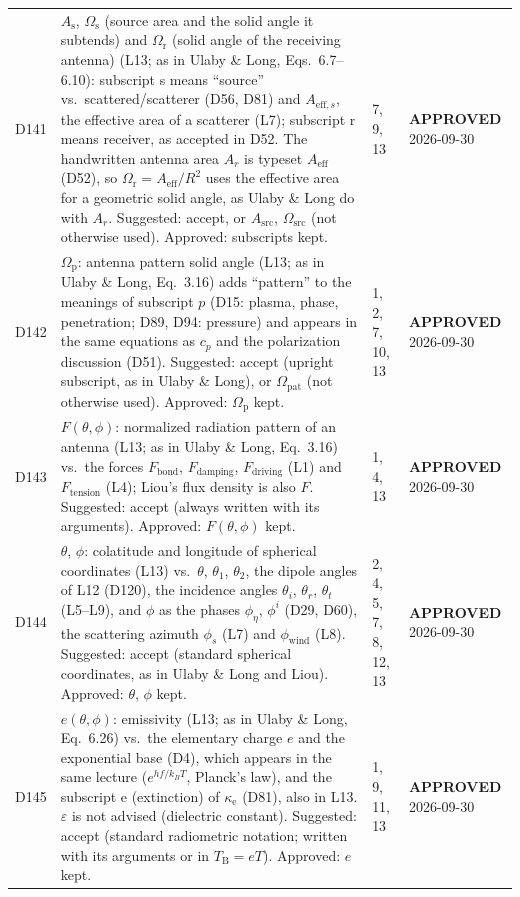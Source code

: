 \documentclass[11pt, oneside]{article}
\newcommand{\approved}{\textbf{APPROVED}}
\begin{document}
\begin{longtable}{l >{\raggedright\arraybackslash}p{} l l}
D141 & $A_\mathrm{s}$, $\Omega_\mathrm{s}$ (source area and the solid angle it subtends) and $\Omega_\mathrm{r}$ (solid angle of the receiving antenna) (L13; as in Ulaby \& Long, Eqs.~6.7--6.10): subscript s means ``source'' vs.\ scattered/scatterer (D56, D81) and $A_{\mathrm{eff},s}$, the effective area of a scatterer (L7); subscript r means receiver, as accepted in D52. The handwritten antenna area $A_r$ is typeset $A_\mathrm{eff}$ (D52), so $\Omega_\mathrm{r} = A_\mathrm{eff}/R^2$ uses the effective area for a geometric solid angle, as Ulaby \& Long do with $A_r$. Suggested: accept, or $A_\mathrm{src}$, $\Omega_\mathrm{src}$ (not otherwise used). Approved: subscripts kept. & 7, 9, 13 & \approved{} 2026-09-30 \\
D142 & $\Omega_\mathrm{p}$: antenna pattern solid angle (L13; as in Ulaby \& Long, Eq.~3.16) adds ``pattern'' to the meanings of subscript $p$ (D15: plasma, phase, penetration; D89, D94: pressure) and appears in the same equations as $c_p$ and the polarization discussion (D51). Suggested: accept (upright subscript, as in Ulaby \& Long), or $\Omega_\mathrm{pat}$ (not otherwise used). Approved: $\Omega_\mathrm{p}$ kept. & 1, 2, 7, 10, 13 & \approved{} 2026-09-30 \\
D143 & $F(\theta,\phi)$: normalized radiation pattern of an antenna (L13; as in Ulaby \& Long, Eq.~3.16) vs.\ the forces $F_\mathrm{bond}$, $F_\mathrm{damping}$, $F_\mathrm{driving}$ (L1) and $F_\mathrm{tension}$ (L4); Liou's flux density is also $F$. Suggested: accept (always written with its arguments). Approved: $F(\theta,\phi)$ kept. & 1, 4, 13 & \approved{} 2026-09-30 \\
D144 & $\theta$, $\phi$: colatitude and longitude of spherical coordinates (L13) vs.\ $\theta$, $\theta_1$, $\theta_2$, the dipole angles of L12 (D120), the incidence angles $\theta_i$, $\theta_r$, $\theta_t$ (L5--L9), and $\phi$ as the phases $\phi_\eta$, $\phi^i$ (D29, D60), the scattering azimuth $\phi_s$ (L7) and $\phi_\mathrm{wind}$ (L8). Suggested: accept (standard spherical coordinates, as in Ulaby \& Long and Liou). Approved: $\theta$, $\phi$ kept. & 2, 4, 5, 7, 8, 12, 13 & \approved{} 2026-09-30 \\
D145 & $e(\theta,\phi)$: emissivity (L13; as in Ulaby \& Long, Eq.~6.26) vs.\ the elementary charge $e$ and the exponential base (D4), which appears in the same lecture ($e^{hf/k_BT}$, Planck's law), and the subscript e (extinction) of $\kappa_\mathrm{e}$ (D81), also in L13. $\varepsilon$ is not advised (dielectric constant). Suggested: accept (standard radiometric notation; written with its arguments or in $T_\mathrm{B} = eT$). Approved: $e$ kept. & 1, 9, 11, 13 & \approved{} 2026-09-30 \\

\end{longtable}
\end{document}
